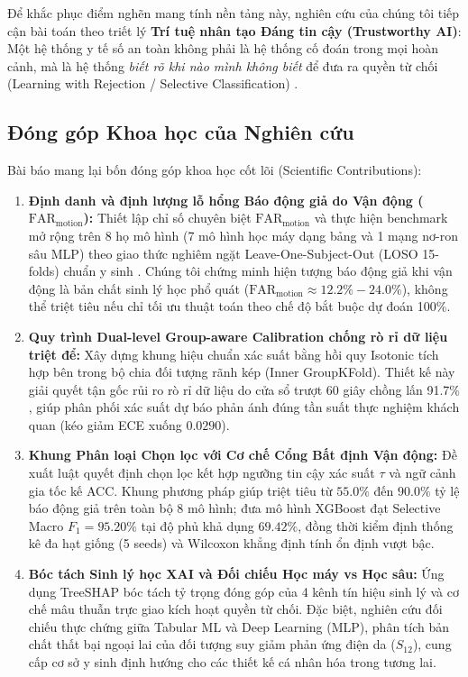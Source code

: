 \documentclass[conference]{IEEEtran}
\begin{document}
Để khắc phục điểm nghẽn mang tính nền tảng này, nghiên cứu của chúng tôi tiếp cận bài toán theo triết lý \textbf{Trí tuệ nhân tạo Đáng tin cậy (Trustworthy AI)}: Một hệ thống y tế số an toàn không phải là hệ thống cố đoán trong mọi hoàn cảnh, mà là hệ thống \textit{biết rõ khi nào mình không biết} để đưa ra quyền từ chối (Learning with Rejection / Selective Classification) \cite{chow1970optimum, geifman2017selective, geifman2019selectivenet, cortes2016learning, hendrickx2021machine}.

\subsection{Đóng góp Khoa học của Nghiên cứu}
Bài báo mang lại bốn đóng góp khoa học cốt lõi (Scientific Contributions):
\begin{enumerate}
    \item \textbf{Định danh và định lượng lỗ hổng Báo động giả do Vận động ($\text{FAR}_{\text{motion}}$):} Thiết lập chỉ số chuyên biệt $\text{FAR}_{\text{motion}}$ và thực hiện benchmark mở rộng trên 8 họ mô hình (7 mô hình học máy dạng bảng và 1 mạng nơ-ron sâu MLP) theo giao thức nghiêm ngặt Leave-One-Subject-Out (LOSO 15-folds) chuẩn y sinh \cite{saeb2017need, little2019using}. Chúng tôi chứng minh hiện tượng báo động giả khi vận động là bản chất sinh lý học phổ quát ($\text{FAR}_{\text{motion}} \approx 12.2\% - 24.0\%$), không thể triệt tiêu nếu chỉ tối ưu thuật toán theo chế độ bắt buộc dự đoán 100\%.
    \item \textbf{Quy trình Dual-level Group-aware Calibration chống rò rỉ dữ liệu triệt để:} Xây dựng khung hiệu chuẩn xác suất bằng hồi quy Isotonic tích hợp bên trong bộ chia đối tượng rãnh kép (Inner GroupKFold). Thiết kế này giải quyết tận gốc rủi ro rò rỉ dữ liệu do cửa sổ trượt 60 giây chồng lấn 91.7\% \cite{saeb2017need}, giúp phân phối xác suất dự báo phản ánh đúng tần suất thực nghiệm khách quan (kéo giảm ECE xuống $0.0290$).
    \item \textbf{Khung Phân loại Chọn lọc với Cơ chế Cổng Bất định Vận động:} Đề xuất luật quyết định chọn lọc kết hợp ngưỡng tin cậy xác suất $\tau$ và ngữ cảnh gia tốc kế ACC. Khung phương pháp giúp triệt tiêu từ $55.0\%$ đến $90.0\%$ tỷ lệ báo động giả trên toàn bộ 8 mô hình; đưa mô hình XGBoost đạt Selective Macro $F_1 = 95.20\%$ tại độ phủ khả dụng $69.42\%$, đồng thời kiểm định thống kê đa hạt giống (5 seeds) và Wilcoxon khẳng định tính ổn định vượt bậc.
    \item \textbf{Bóc tách Sinh lý học XAI và Đối chiếu Học máy vs Học sâu:} Ứng dụng TreeSHAP \cite{lundberg2017unified} bóc tách tỷ trọng đóng góp của 4 kênh tín hiệu sinh lý và cơ chế mâu thuẫn trực giao kích hoạt quyền từ chối. Đặc biệt, nghiên cứu đối chiếu thực chứng giữa Tabular ML và Deep Learning (MLP), phân tích bản chất thất bại ngoại lai của đối tượng suy giảm phản ứng điện da ($S_{12}$), cung cấp cơ sở y sinh định hướng cho các thiết kế cá nhân hóa trong tương lai.
\end{enumerate}
\end{document}
